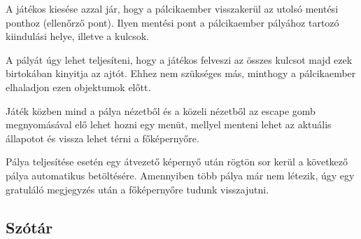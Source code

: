 	A játékos kiesése azzal jár, hogy a pálcikaember visszakerül az utolsó mentési ponthoz (ellenőrző pont). Ilyen mentési pont a pálcikaember pályához tartozó kiindulási helye, illetve a kulcsok.
	
	A pályát úgy lehet teljesíteni, hogy a játékos felveszi az összes kulcsot majd ezek birtokában kinyitja az ajtót. Ehhez nem szükséges más, minthogy a pálcikaember elhaladjon ezen objektumok előtt.
	
	Játék közben mind a pálya nézetből és a közeli nézetből az escape gomb megnyomásával elő lehet hozni egy menüt, mellyel menteni lehet az aktuális állapotot és vissza lehet térni a főképernyőre.
	
	Pálya teljesítése esetén egy átvezető képernyő után rögtön sor kerül a következő pálya automatikus betöltésére. Amennyiben több pálya már nem létezik, úgy egy gratuláló megjegyzés után a főképernyőre tudunk visszajutni.

\subsection{Szótár}

